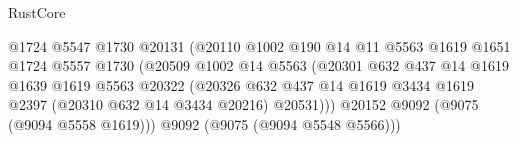 \begin{lexlean}{RustCore}
\begin{coremodule}
                                                  @1724
                                                  @5547
                                                  @1730
                                                  @20131
                                                  (@20110
                                                    @1002
                                                    @190
                                                    @14
                                                    @11
                                                    @5563
                                                    @1619
                                                    @1651
                                                    @1724
                                                    @5557
                                                    @1730
                                                    (@20509
                                                      @1002
                                                      @14
                                                      @5563
                                                      (@20301
                                                        @632
                                                        @437
                                                        @14
                                                        @1619
                                                        @1639
                                                        @1619
                                                        @5563
                                                        @20322
                                                        (@20326
                                                          @632
                                                          @437
                                                          @14
                                                          @1619
                                                          @3434
                                                          @1619
                                                          @2397
                                                          (@20310 @632 @14 @3434 @20216)
                                                          @20531)))
                                                    @20152
                                                    @9092
                                                    (@9075 (@9094 @5558 @1619)))
                                                  @9092
                                                  (@9075 (@9094 @5548 @5566)))

\end{coremodule}
\end{lexlean}
